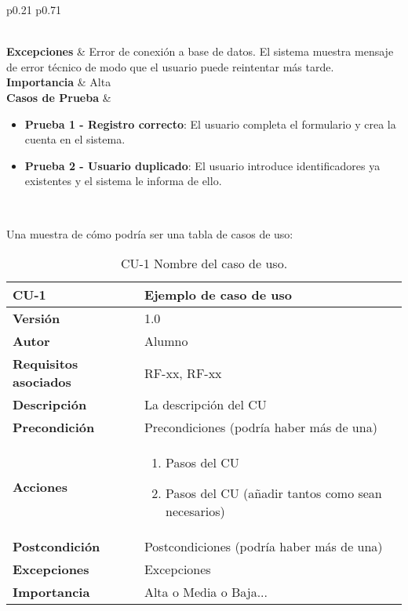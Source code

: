 \begin{table}[H]
\begin{tabularx}{\linewidth}{ p{0.21\columnwidth} p{0.71\columnwidth} }
\begin{itemize}
  		\end{itemize} \\
		\textbf{Excepciones}          &  Error de conexión a base de datos. El sistema muestra mensaje de error técnico de modo que el usuario puede reintentar más tarde.\\
		\textbf{Importancia}          & Alta \\
		\textbf{Casos de Prueba}      &
		\begin{itemize}
			\item \textbf{Prueba 1 - Registro correcto}: El usuario completa el formulario y crea la cuenta en el sistema.
			\item \textbf{Prueba 2 - Usuario duplicado}: El usuario introduce identificadores ya existentes y el sistema le informa de ello.
		\end{itemize} \\
		\bottomrule
	\end{tabularx}
	\caption{CU06 Gestionar Usuarios}
	\label{cu:gestionar-usuarios}
\end{table}









Una muestra de cómo podría ser una tabla de casos de uso:

\begin{table}[p]
	\centering
	\begin{tabularx}{\linewidth}{ p{} p{} }
		\toprule
		\textbf{CU-1}    & \textbf{Ejemplo de caso de uso}\\
		\toprule
		\textbf{Versión}              & 1.0    \\
		\textbf{Autor}                & Alumno \\
		\textbf{Requisitos asociados} & RF-xx, RF-xx \\
		\textbf{Descripción}          & La descripción del CU \\
		\textbf{Precondición}         & Precondiciones (podría haber más de una) \\
		\textbf{Acciones}             &
		\begin{enumerate}
			\def\labelenumi{\arabic{enumi}.}
			\tightlist
			\item Pasos del CU
			\item Pasos del CU (añadir tantos como sean necesarios)
		\end{enumerate}\\
		\textbf{Postcondición}        & Postcondiciones (podría haber más de una) \\
		\textbf{Excepciones}          & Excepciones \\
		\textbf{Importancia}          & Alta o Media o Baja... \\
		\bottomrule
	\end{tabularx}
	\caption{CU-1 Nombre del caso de uso.}
\end{table}

